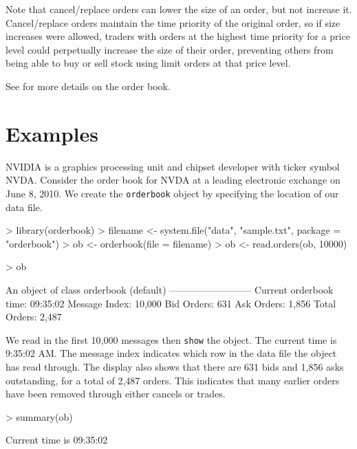 \documentclass[a4paper]{report}
\begin{document}
\begin{article}
Note that cancel/replace orders can lower the size of an
order, but not increase it. Cancel/replace orders maintain the time
priority of the original order, so if size increases were allowed,
traders with orders at the highest time priority for a price level
could perpetually increase the size of their order, preventing others
from being able to buy or sell stock using limit orders at that price
level.

See \cite{johnson:barry} for more details on the order book.

\section*{Examples}

NVIDIA is a graphics processing unit and chipset developer with ticker
symbol NVDA. Consider the order book for NVDA at a leading electronic
exchange on June 8, 2010. We create the \texttt{orderbook} object by
specifying the location of our data file.

\begin{Schunk}
\begin{Sinput}
> library(orderbook)
> filename <- system.file("data", "sample.txt", package = "orderbook")
> ob <- orderbook(file = filename)
> ob <- read.orders(ob, 10000)
\end{Sinput}
\end{Schunk}
\begin{Schunk}
\begin{Sinput}
> ob
\end{Sinput}
\begin{Soutput}
An object of class orderbook (default)
--------------------------
Current orderbook time:    09:35:02 
Message Index:             10,000 
Bid Orders:                631 
Ask Orders:                1,856 
Total Orders:              2,487 
\end{Soutput}
\end{Schunk}

We read in the first 10,000 messages then \texttt{show} the object.
The current time is 9:35:02 AM. The message index indicates which row
in the data file the object has read through. The display also shows
that there are 631 bids and 1,856 asks outstanding, for a total of
2,487 orders. This indicates that many earlier orders have been
removed through either cancels or trades.

\begin{Schunk}
\begin{Sinput}
> summary(ob)
\end{Sinput}
\begin{Soutput}
Current time is 09:35:02 


\end{Soutput}
\end{Schunk}
\end{article}
\end{document}
